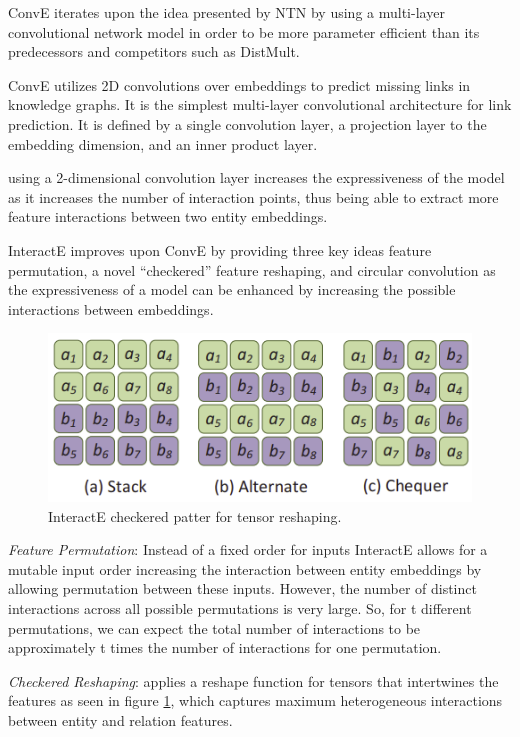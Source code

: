 ConvE \cite{} iterates upon the idea presented by NTN by using a multi-layer convolutional network model in order to be more parameter efficient than its predecessors and competitors such as DistMult. 

ConvE utilizes 2D convolutions over embeddings to predict missing links in knowledge graphs. It is the simplest multi-layer convolutional architecture for link prediction. It is defined by a single convolution layer, a projection layer to the embedding dimension, and an inner product layer.

using a 2-dimensional convolution layer increases the expressiveness of the model as it increases the number of interaction points, thus being able to extract more feature interactions between two entity embeddings.

InteractE \cite{} improves upon ConvE by providing three key ideas feature permutation, a novel ``checkered'' feature reshaping, and circular convolution as the expressiveness of a model can be enhanced by increasing the possible interactions between embeddings.

\begin{figure}[!ht]
    \centering
    \includegraphics[width=.65\textwidth]{fig/embeddings/InteractE.png}
    \caption{InteractE checkered patter for tensor reshaping.}
    \label{fig:emb-interactE}
\end{figure}

\textit{Feature Permutation}: Instead of a fixed order for inputs InteractE allows for a mutable input order increasing the interaction between entity embeddings by allowing permutation between these inputs. However, the number of distinct interactions across all possible permutations is very large. So, for t different permutations, we can expect the total number of interactions to be approximately t times the number of interactions for one permutation.

\textit{Checkered Reshaping}: applies a reshape function for tensors that intertwines the features as seen in figure \ref{fig:emb-interactE}, which captures maximum heterogeneous interactions between entity and relation features.

